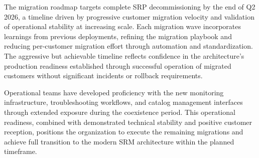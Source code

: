 The migration roadmap targets complete SRP decommissioning by the end of Q2 2026, a timeline driven by progressive customer migration velocity and validation of operational stability at increasing scale. Each migration wave incorporates learnings from previous deployments, refining the migration playbook and reducing per-customer migration effort through automation and standardization. The aggressive but achievable timeline reflects confidence in the architecture's production readiness established through successful operation of migrated customers without significant incidents or rollback requirements.

Operational teams have developed proficiency with the new monitoring infrastructure, troubleshooting workflows, and catalog management interfaces through extended exposure during the coexistence period. This operational readiness, combined with demonstrated technical stability and positive customer reception, positions the organization to execute the remaining migrations and achieve full transition to the modern SRM architecture within the planned timeframe.